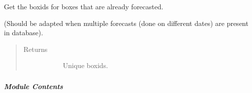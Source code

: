 \documentclass[letterpaper,10pt,english]{sphinxmanual}
\begin{document}

\begin{fulllineitems}
\label{\detokenize{autoapi/src/utils/snowflake/index:src.utils.snowflake.get_forecasted_boxids}}
Get the boxids for boxes that are already forecasted.

(Should be adapted when multiple forecasts (done on different dates) are present in database).
\begin{quote}\begin{description}
\item[{Returns}] \leavevmode\begin{description}
\item[{}] \leavevmode
Unique boxids.

\end{description}

\end{description}\end{quote}

\end{fulllineitems}



\subparagraph{}
\label{\detokenize{autoapi/src/utils/vault/index:module-src.utils.vault}}\label{\detokenize{autoapi/src/utils/vault/index:src-utils-vault}}\label{\detokenize{autoapi/src/utils/vault/index::doc}}

\subparagraph{Module Contents}
\label{\detokenize{autoapi/src/utils/vault/index:module-contents}}
\end{document}
